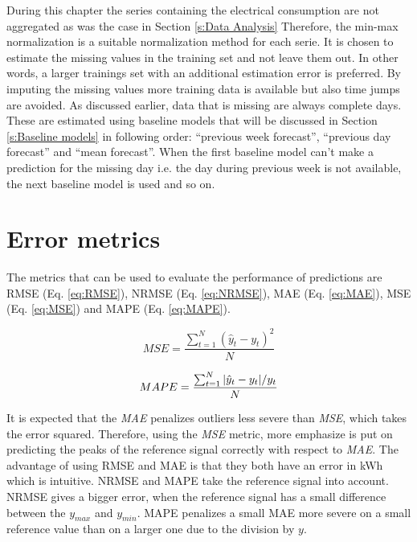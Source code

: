 During this chapter the series containing the electrical consumption are not aggregated as was the case in Section \ref{s:Data Analysis} Therefore, the min-max normalization is a suitable normalization method for each serie. It is chosen to estimate the missing values in the training set and not leave them out. In other words, a larger trainings set with an additional estimation error is preferred. By imputing the missing values more training data is available but also time jumps are avoided. As discussed earlier, data that is missing are always complete days. These are estimated using baseline models that will be discussed in Section \ref{s:Baseline models} in following order: ``previous week forecast'', ``previous day forecast'' and ``mean forecast''. When the first baseline model can't make a prediction for the missing day i.e. the day during previous week is not available, the next baseline model is used and so on.\\

\section{Error metrics}\label{s:Error metrics}
The metrics that can be used to evaluate the performance of predictions are  RMSE (Eq. \ref{eq:RMSE}), NRMSE (Eq. \ref{eq:NRMSE}),  MAE  (Eq. \ref{eq:MAE}),  MSE (Eq. \ref{eq:MSE}) and MAPE (Eq. \ref{eq:MAPE}).

\begin{equation}\label{eq:MSE}
	MSE = \frac{\sum_{t=1}^{N}(\hat{y}_t-y_t)^2}{N}
\end{equation}

\begin{equation}\label{eq:MAPE}
	MAPE = \frac{\sum_{t=1}^{N}\abs{\hat{y}_t-y_t}/y_t}{N}
\end{equation}


It is expected that the \textit{MAE} penalizes outliers less severe than \textit{MSE}, which takes the error squared. Therefore, using the \textit{MSE} metric, more emphasize is put on predicting the peaks of the reference signal correctly with respect to \textit{MAE}. The advantage of using  RMSE  and MAE  is that they both have an error in kWh which is intuitive.  NRMSE  and  MAPE  take the reference signal into account. NRMSE  gives a bigger error, when the reference signal has a small difference between the $ y_{max} $ and $ y_{min} $.  MAPE  penalizes a small MAE more severe on a small reference value than on a larger one due to the division by $ y $.


